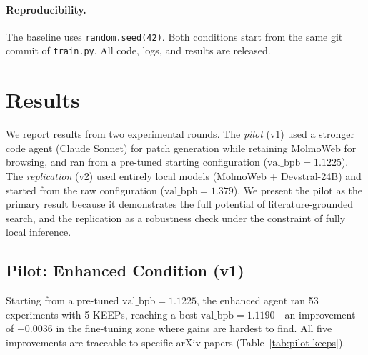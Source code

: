 \documentclass[11pt]{article}
\newcommand{\val}{\text{val\_bpb}}
\begin{document}
\paragraph{Reproducibility.}
The baseline uses \texttt{random.seed(42)}. Both conditions start from
the same git commit of \texttt{train.py}. All code, logs, and results
are released.


\section{Results}
\label{sec:results}

We report results from two experimental rounds. The \emph{pilot} (v1)
used a stronger code agent (Claude Sonnet) for patch generation while
retaining MolmoWeb for browsing, and ran from a pre-tuned starting
configuration ($\val = 1.1225$). The \emph{replication} (v2) used
entirely local models (MolmoWeb + Devstral-24B) and started from the
raw configuration ($\val = 1.379$). We present the pilot as the primary
result because it demonstrates the full potential of literature-grounded
search, and the replication as a robustness check under the constraint
of fully local inference.

\subsection{Pilot: Enhanced Condition (v1)}
\label{sec:results-pilot}

Starting from a pre-tuned $\val = 1.1225$, the enhanced agent ran 53
experiments with 5 KEEPs, reaching a best $\val = 1.1190$---an
improvement of $-0.0036$ in the fine-tuning zone where gains are
hardest to find. All five improvements are traceable to specific arXiv
papers (Table~\ref{tab:pilot-keeps}).
\end{document}
